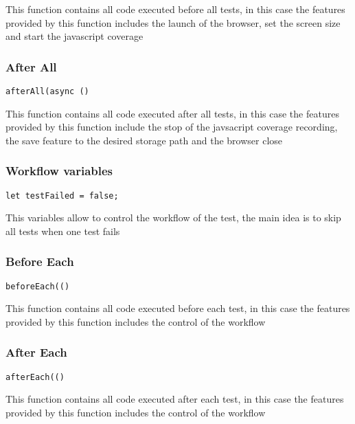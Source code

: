 \documentclass[a4paper]{article}
\begin{document}
This function contains all code executed before all tests, in this case the
features provided by this function includes the launch of the browser, set
the screen size and start the javascript coverage

\hypertarget{toc548}{}
\subsubsection{After All}

\begin{lstlisting}
afterAll(async ()
\end{lstlisting}

This function contains all code executed after all tests, in this case the
features provided by this function include the stop of the javsacript coverage
recording, the save feature to the desired storage path and the browser close

\hypertarget{toc549}{}
\subsubsection{Workflow variables}

\begin{lstlisting}
let testFailed = false;
\end{lstlisting}

This variables allow to control the workflow of the test, the main idea is to
skip all tests when one test fails

\hypertarget{toc550}{}
\subsubsection{Before Each}

\begin{lstlisting}
beforeEach(()
\end{lstlisting}

This function contains all code executed before each test, in this case the
features provided by this function includes the control of the workflow

\hypertarget{toc551}{}
\subsubsection{After Each}

\begin{lstlisting}
afterEach(()
\end{lstlisting}

This function contains all code executed after each test, in this case the
features provided by this function includes the control of the workflow
\end{document}
